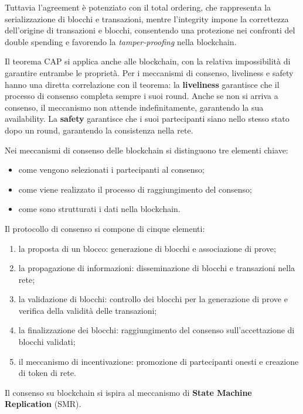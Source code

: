 Tuttavia l'agreement è potenziato con il total ordering, che rappresenta la serializzazione di blocchi e transazioni, mentre l'integrity impone la correttezza dell'origine di transazioni e blocchi, consentendo una protezione nei confronti del double spending e favorendo la \textit{tamper-proofing} nella blockchain.

\vspace{5mm}

Il teorema CAP si applica anche alle blockchain, con la relativa impossibilità di garantire entrambe le proprietà. Per i meccanismi di consenso, liveliness e safety hanno una diretta correlazione con il teorema: la \textbf{liveliness} garantisce che il processo di consenso completa sempre i suoi round. Anche se non si arriva a consenso, il meccanismo non attende indefinitamente, garantendo la sua availability. La \textbf{safety} garantisce che i suoi partecipanti siano nello stesso stato dopo un round, garantendo la consistenza nella rete.

Nei meccanismi di consenso delle blockchain si distinguono tre elementi chiave:
\begin{itemize}
    \item come vengono selezionati i partecipanti al consenso;
    \item come viene realizzato il processo di raggiungimento del consenso;
    \item come sono strutturati i dati nella blockchain.
\end{itemize}
Il protocollo di consenso si compone di cinque elementi:
\renewcommand{\theenumi}{\arabic{enumi}}
\begin{enumerate}
    \item la proposta di un blocco: generazione di blocchi e associazione di prove;
    \item la propagazione di informazioni: disseminazione di blocchi e transazioni nella rete;
    \item la validazione di blocchi: controllo dei blocchi per la generazione di prove e verifica della validità delle transazioni;
    \item la finalizzazione dei blocchi: raggiungimento del consenso sull'accettazione di blocchi validati;
    \item il meccanismo di incentivazione: promozione di partecipanti onesti e creazione di token di rete.
\end{enumerate}
Il consenso su blockchain si ispira al meccanismo di \textbf{State Machine Replication} (SMR).

